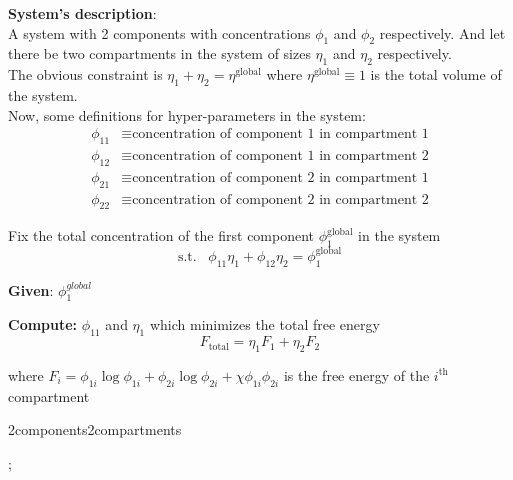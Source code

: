 \documentclass{article}
\begin{document}
	
	
	\noindent
	\textbf{System's description}: \\A system with 2 components with concentrations $\phi_1$ and $\phi_2$ respectively. And let there be two compartments in the system of sizes $\eta_1$ and $\eta_2$ respectively.\\
	
	\noindent
	The obvious constraint is $\eta_1 + \eta_2 = \eta^{\text{global}}$ where $\eta^{\text{global}} \equiv 1$ is the total volume of the system.\\
	
	\noindent
	Now, some definitions for hyper-parameters in the system:
	\begin{align*}
		\phi_{11} &\equiv \text{concentration of component 1 in compartment 1}\\
		\phi_{12} &\equiv \text{concentration of component 1 in compartment 2}\\
		\phi_{21} &\equiv \text{concentration of component 2 in compartment 1}\\
		\phi_{22} &\equiv \text{concentration of component 2 in compartment 2}				
	\end{align*}
	
	\noindent
	Fix the total concentration of the first component $\phi_1^{\text{global}}$ in the system 
	$$
	\text{s.t.}\;\;\; \phi_{11}\eta_1 + \phi_{12}\eta_2 = \phi_1^{\text{global}}
	$$
	
	\noindent
	\textbf{Given}: $\phi_1^{global}$
	
	\noindent
	\textbf{Compute:} $\phi_{11}$ and $\eta_1$ which minimizes the total free energy
	$$F_{\text{total}} = \eta_1F_1 + \eta_2F_2$$
	
	where $F_i = \phi_{1i}\log{\phi_{1i}} + \phi_{2i}\log{\phi_{2i}} + \chi\phi_{1i}\phi_{2i}$ is the free energy of the $i^{\text{th}}$ compartment
	
	
	
	
	\begin{algorithm}
		\caption{2components2compartments}\label{alg:2components2compartments}
		
		
		
		;
		
	\end{algorithm}
\end{document}
